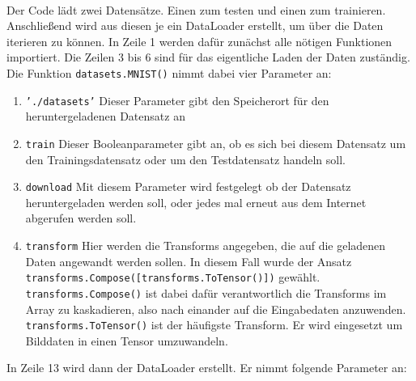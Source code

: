 \documentclass{article}
\begin{document}
\\
Der Code lädt zwei Datensätze. Einen zum testen und einen zum trainieren. Anschließend wird aus diesen je ein DataLoader erstellt, um über die Daten iterieren zu können. In Zeile 1 werden dafür zunächst alle nötigen Funktionen importiert. Die Zeilen 3 bis 6 sind für das eigentliche Laden der Daten zuständig. \\
Die Funktion \texttt{datasets.MNIST()} nimmt dabei vier Parameter an:
\begin{enumerate}
	\item \texttt{'./datasets'} Dieser Parameter gibt den Speicherort für den heruntergeladenen Datensatz an
	\item \texttt{train} Dieser Booleanparameter gibt an, ob es sich bei diesem Datensatz um den Trainingsdatensatz oder um den Testdatensatz handeln soll.
	\item \texttt{download} Mit diesem Parameter wird festgelegt ob der Datensatz heruntergeladen werden soll, oder jedes mal erneut aus dem Internet abgerufen werden soll.
	\item \texttt{transform} Hier werden die Transforms angegeben, die auf die geladenen Daten angewandt werden sollen. In diesem Fall wurde der Ansatz\\ \texttt{transforms.Compose([transforms.ToTensor()])} gewählt.\\ \texttt{transforms.Compose()} ist dabei dafür verantwortlich die Transforms im Array zu kaskadieren, also nach einander auf die Eingabedaten anzuwenden. \\
	\texttt{transforms.ToTensor()} ist der häufigste Transform. Er wird eingesetzt um Bilddaten in einen Tensor umzuwandeln.
\end{enumerate}
In Zeile 13 wird dann der DataLoader erstellt. Er nimmt folgende Parameter an:
\end{document}

